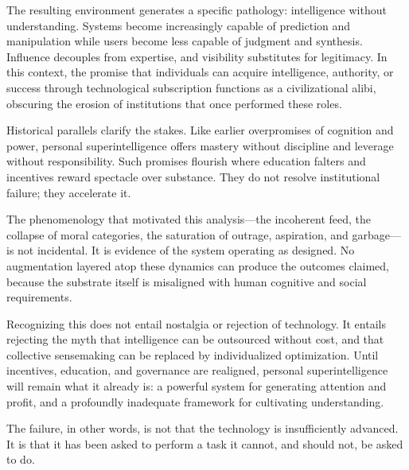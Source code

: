 \documentclass[12pt]{article}
\begin{document}
The resulting environment generates a specific pathology: intelligence without understanding. Systems become increasingly capable of prediction and manipulation while users become less capable of judgment and synthesis. Influence decouples from expertise, and visibility substitutes for legitimacy. In this context, the promise that individuals can acquire intelligence, authority, or success through technological subscription functions as a civilizational alibi, obscuring the erosion of institutions that once performed these roles.

Historical parallels clarify the stakes. Like earlier overpromises of cognition and power, personal superintelligence offers mastery without discipline and leverage without responsibility. Such promises flourish where education falters and incentives reward spectacle over substance. They do not resolve institutional failure; they accelerate it.

The phenomenology that motivated this analysis—the incoherent feed, the collapse of moral categories, the saturation of outrage, aspiration, and garbage—is not incidental. It is evidence of the system operating as designed. No augmentation layered atop these dynamics can produce the outcomes claimed, because the substrate itself is misaligned with human cognitive and social requirements.

Recognizing this does not entail nostalgia or rejection of technology. It entails rejecting the myth that intelligence can be outsourced without cost, and that collective sensemaking can be replaced by individualized optimization. Until incentives, education, and governance are realigned, personal superintelligence will remain what it already is: a powerful system for generating attention and profit, and a profoundly inadequate framework for cultivating understanding.

The failure, in other words, is not that the technology is insufficiently advanced. It is that it has been asked to perform a task it cannot, and should not, be asked to do.
\end{document}
